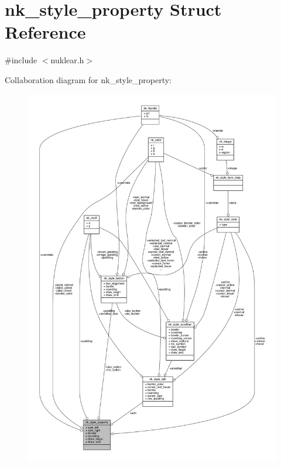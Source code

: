 \hypertarget{structnk__style__property}{}\section{nk\+\_\+style\+\_\+property Struct Reference}
\label{structnk__style__property}


{\ttfamily \#include $<$nuklear.\+h$>$}



Collaboration diagram for nk\+\_\+style\+\_\+property\+:
\nopagebreak
\begin{figure}[H]
\begin{center}
\leavevmode
\includegraphics[width=350pt]{structnk__style__property__coll__graph}
\end{center}
\end{figure}
